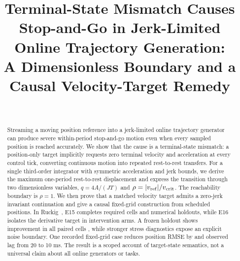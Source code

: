 \documentclass[10pt,twocolumn]{article}
\title{Terminal-State Mismatch Causes Stop-and-Go in Jerk-Limited Online Trajectory Generation:\\A Dimensionless Boundary and a Causal Velocity-Target Remedy}
\author{\paperauthor\\\small\paperaffiliation}
\date{\paperdate}
\begin{document}
\maketitle
\paperdraftnotice

\begin{abstract}
Streaming a moving position reference into a jerk-limited online trajectory generator can produce severe within-period stop-and-go motion even when every sampled position is reached accurately. We show that the cause is a terminal-state mismatch: a position-only target implicitly requests zero terminal velocity and acceleration at every control tick, converting continuous motion into repeated rest-to-rest transfers. For a single third-order integrator with symmetric acceleration and jerk bounds, we derive the maximum one-period rest-to-rest displacement and express the transition through two dimensionless variables, $q=4A/(JT)$ and $\rho=\lvert v_{\mathrm{ref}}\rvert/v_{\mathrm{crit}}$. The reachability boundary is $\rho=1$. We then prove that a matched velocity target admits a zero-jerk invariant continuation and give a causal fixed-grid construction from scheduled positions. In Ruckig~\RuckigVersion, E15 completes \EFifteenGridCount{} required cells and \EFifteenSobolCount{} numerical holdouts, while E16 isolates the derivative target in \ESixteenArmCount{} intervention arms. A frozen holdout shows improvement in all \ESeventeenWorkPairCount{} paired cells \testedEnvelope, while stronger stress diagnostics expose an explicit noise boundary. One recorded fixed-grid case reduces position RMSE by \RecordedPVReductionPercent{} and observed lag from 20 to 10 ms. The result is a scoped account of target-state semantics, not a universal claim about all online generators or tasks.
\end{abstract}













\appendix







\end{document}
